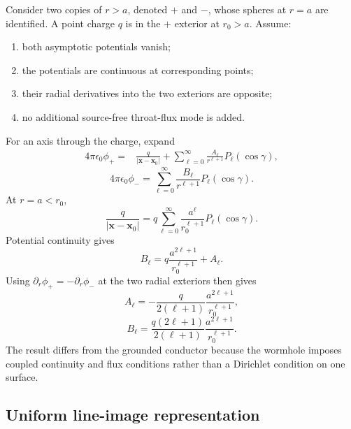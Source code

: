 \documentclass[journal,a4paper]{IEEEtran}
\begin{document}
Consider two copies of \(r>a\), denoted \(+\) and \(-\), whose spheres at \(r=a\) are identified. A point charge \(q\) is in the \(+\) exterior at \(r_0>a\). Assume:
\begin{enumerate}
    \item both asymptotic potentials vanish;
    \item the potentials are continuous at corresponding points;
    \item their radial derivatives into the two exteriors are opposite;
    \item no additional source-free throat-flux mode is added.
\end{enumerate}
For an axis through the charge, expand
\begin{equation}
\begin{split}
4\pi\epsilon_0\phi_+
={}&\frac{q}{|\mathbf x-\mathbf x_0|}
+\sum_{\ell=0}^{\infty}
\frac{A_\ell}{r^{\ell+1}}P_\ell(\cos\gamma),
\label{eq:phi_plus_expansion}
\end{split}
\end{equation}
\begin{equation}
    4\pi\epsilon_0\phi_-
    =\sum_{\ell=0}^{\infty}
    \frac{B_\ell}{r^{\ell+1}}P_\ell(\cos\gamma).
    \label{eq:phi_minus_expansion}
\end{equation}
At \(r=a<r_0\),
\begin{equation}
    \frac{q}{|\mathbf x-\mathbf x_0|}
    =q\sum_{\ell=0}^{\infty}
    \frac{a^\ell}{r_0^{\ell+1}}P_\ell(\cos\gamma).
\end{equation}
Potential continuity gives
\begin{equation}
    B_\ell
    =q\frac{a^{2\ell+1}}{r_0^{\ell+1}}+A_\ell.
    \label{eq:continuity_coeff}
\end{equation}
Using \(\partial_r\phi_+=-\partial_r\phi_-\) at the two radial exteriors then gives
\begin{equation}
    A_\ell
    =-\frac{q}{2(\ell+1)}
    \frac{a^{2\ell+1}}{r_0^{\ell+1}},
    \label{eq:spherical_coeff_A}
\end{equation}
\begin{equation}
    B_\ell
    =\frac{q(2\ell+1)}{2(\ell+1)}
    \frac{a^{2\ell+1}}{r_0^{\ell+1}}.
    \label{eq:spherical_coeff_B}
\end{equation}
The result differs from the grounded conductor because the wormhole imposes coupled continuity and flux conditions rather than a Dirichlet condition on one surface.

\subsection{Uniform line-image representation}
\end{document}
